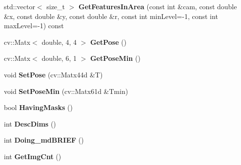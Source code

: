 \begin{DoxyCompactItemize}
\item 
std\+::vector$<$ size\+\_\+t $>$ {\bfseries Get\+Features\+In\+Area} (const int \&cam, const double \&x, const double \&y, const double \&r, const int min\+Level=-\/1, const int max\+Level=-\/1) const \hypertarget{classMultiColSLAM_1_1cMultiFrame_a6e108ed4d3cc3410768977f2d8b79f1c}{}\label{classMultiColSLAM_1_1cMultiFrame_a6e108ed4d3cc3410768977f2d8b79f1c}

\item 
cv\+::\+Matx$<$ double, 4, 4 $>$ {\bfseries Get\+Pose} ()\hypertarget{classMultiColSLAM_1_1cMultiFrame_a8e951c3eac1c85c5aced5d87797de9c9}{}\label{classMultiColSLAM_1_1cMultiFrame_a8e951c3eac1c85c5aced5d87797de9c9}

\item 
cv\+::\+Matx$<$ double, 6, 1 $>$ {\bfseries Get\+Pose\+Min} ()\hypertarget{classMultiColSLAM_1_1cMultiFrame_a42a217979b1bf791a35855fb7a3e0718}{}\label{classMultiColSLAM_1_1cMultiFrame_a42a217979b1bf791a35855fb7a3e0718}

\item 
void {\bfseries Set\+Pose} (cv\+::\+Matx44d \&T)\hypertarget{classMultiColSLAM_1_1cMultiFrame_aa515f96d4a8e3da69ebb8e38ca13eb5d}{}\label{classMultiColSLAM_1_1cMultiFrame_aa515f96d4a8e3da69ebb8e38ca13eb5d}

\item 
void {\bfseries Set\+Pose\+Min} (cv\+::\+Matx61d \&Tmin)\hypertarget{classMultiColSLAM_1_1cMultiFrame_a9b111a8f9a80581ee104325174d4a0e7}{}\label{classMultiColSLAM_1_1cMultiFrame_a9b111a8f9a80581ee104325174d4a0e7}

\item 
bool {\bfseries Having\+Masks} ()\hypertarget{classMultiColSLAM_1_1cMultiFrame_a9a4db34757927f8c3eeb7f327da1694a}{}\label{classMultiColSLAM_1_1cMultiFrame_a9a4db34757927f8c3eeb7f327da1694a}

\item 
int {\bfseries Desc\+Dims} ()\hypertarget{classMultiColSLAM_1_1cMultiFrame_a48fe0b66e5b29cb0e3cba6f8e5ab243d}{}\label{classMultiColSLAM_1_1cMultiFrame_a48fe0b66e5b29cb0e3cba6f8e5ab243d}

\item 
int {\bfseries Doing\+\_\+md\+B\+R\+I\+EF} ()\hypertarget{classMultiColSLAM_1_1cMultiFrame_ac4f81bfd62bf28f9689174f7410e9a8b}{}\label{classMultiColSLAM_1_1cMultiFrame_ac4f81bfd62bf28f9689174f7410e9a8b}

\item 
int {\bfseries Get\+Img\+Cnt} ()\hypertarget{classMultiColSLAM_1_1cMultiFrame_addb2b7203fe4a875ab91b9f18117e1b9}{}\label{classMultiColSLAM_1_1cMultiFrame_addb2b7203fe4a875ab91b9f18117e1b9}

\end{DoxyCompactItemize}
